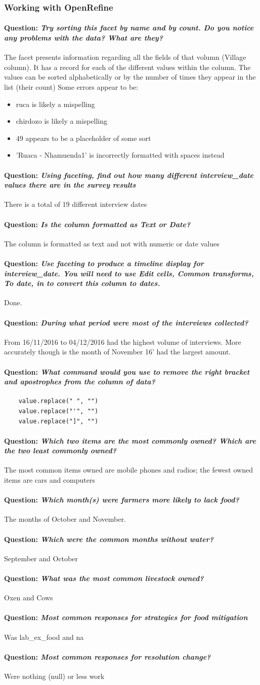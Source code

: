 \documentclass[12pt]{article}
\newcounter{problem} \setcounter{problem}{1}
\newcommand{\question}[1]{\paragraph{Question: {\textnormal{\textit{#1}}} ~\\}}
\begin{document}
\subsubsection{Working with OpenRefine}
\question{Try sorting this facet by name and by count. Do you notice any problems with the data? What are they?}
The facet presents information regarding all the fields of that volumn (Village column). It has a record for each of the different values within the column. The values can be sorted alphabetically or by the number of times they appear in the list (their count)
\newline
Some errors appear to be:
\begin{itemize}
    \item ruca is likely a mispelling
    \item chirdozo is likely a mispelling
    \item 49 appears to be a placeholder of some sort
    \item 'Ruaca - Nhamuenda1' is incorrectly formatted with spaces instead
\end{itemize}

\question{Using faceting, find out how many different interview\_date values there are in the survey results}
There is a total of 19 different interview dates
\question{Is the column formatted as Text or Date?}
The column is formatted as text and not with numeric or date values
\question{Use faceting to produce a timeline display for interview\_date. You will need to use Edit cells, Common transforms, To date, in to convert this column to dates.}
Done.
\question{During what period were most of the interviews collected?}
From 16/11/2016 to 04/12/2016 had the highest volume of interviews. More accurately though is the month of November 16' had the largest amount.
\question{What command would you use to remove the right bracket and apostrophes from the column of data?}
\begin{verbatim}
    value.replace(" ", "")
    value.replace("'", "")
    value.replace("]", "")
\end{verbatim}
\question{Which two items are the most commonly owned? Which are the two least commonly owned?}
The most common items owned are mobile phones and radios; the fewest owned items are cars and computers
\question{Which month(s) were farmers more likely to lack food?}
The months of October and November.
\question{Which were the common months without water?}
September and October
\question{What was the most common livestock owned?}
Oxen and Cows
\question{Most common responses for strategies for food mitigation}
Was lab\_ex\_food and na
\question{Most common responses for resolution change?}
Were nothing (null) or less work
\end{document}

